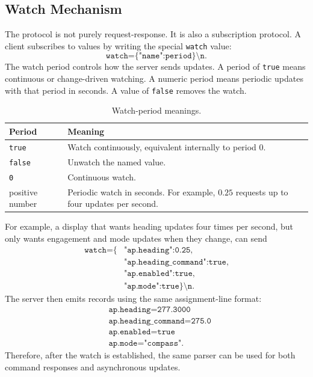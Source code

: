 \documentclass[11pt,twocolumn]{article}
\begin{document}
\subsection{Watch Mechanism}
The protocol is not purely request-response.  It is also a subscription
protocol.  A client subscribes to values by writing the special
\texttt{watch} value:
\[
\texttt{watch=\{"name":period\}\textbackslash n}.
\]
The watch period controls how the server sends updates.  A period of
\texttt{true} means continuous or change-driven watching.  A numeric
period means periodic updates with that period in seconds.  A value of
\texttt{false} removes the watch.
\begin{table}[h]
\centering
\caption{Watch-period meanings.}
\label{tab:pypilot-watch-periods}
\begin{tabularx}{\columnwidth}{Z{0.36\columnwidth}Y}
\toprule
Period & Meaning \\
\midrule
\texttt{true} &
Watch continuously, equivalent internally to period \(0\). \\
\texttt{false} &
Unwatch the named value. \\
\texttt{0} &
Continuous watch. \\
positive number &
Periodic watch in seconds.  For example, \(0.25\) requests up to four
updates per second. \\
\bottomrule
\end{tabularx}
\end{table}
For example, a display that wants heading updates four times per second,
but only wants engagement and mode updates when they change, can send
\[
\begin{split}
\texttt{watch=\{}&
\texttt{"ap.heading":0.25,}\\
&
\texttt{"ap.heading\_command":true,}\\
&
\texttt{"ap.enabled":true,}\\
&
\texttt{"ap.mode":true\}\textbackslash n}.
\end{split}
\]
The server then emits records using the same assignment-line format:
\[
\begin{aligned}
&\texttt{ap.heading=277.3000}\\
&\texttt{ap.heading\_command=275.0}\\
&\texttt{ap.enabled=true}\\
&\texttt{ap.mode="compass"}.
\end{aligned}
\]
Therefore, after the watch is established, the same parser can be used for
both command responses and asynchronous updates.
\end{document}
